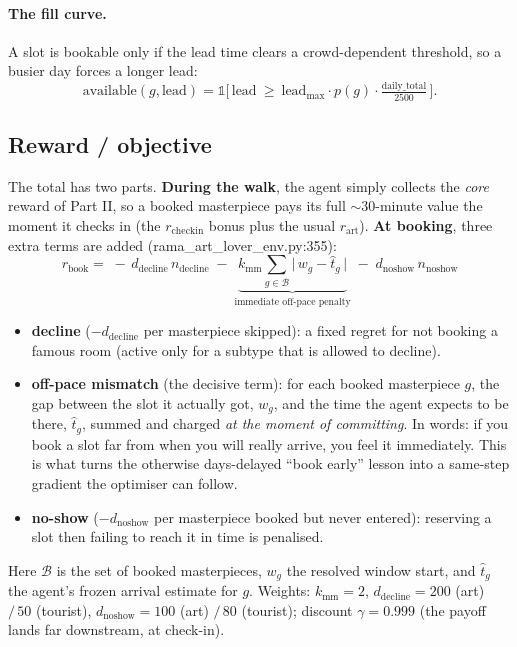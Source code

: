 \documentclass[11pt]{article}
\newcommand{\ind}{\mathbb{1}}
\begin{document}
\paragraph{The fill curve.} A slot is bookable only if the lead time clears a
crowd-dependent threshold, so a busier day forces a longer lead:
\[
\text{available}(g,\text{lead})=\ind\!\Big[\,\text{lead}\ \ge\ \text{lead}_{\max}\cdot p(g)\cdot \tfrac{\text{daily\_total}}{2500}\,\Big].
\]

\subsection{Reward / objective}

The total has two parts. \textbf{During the walk}, the agent simply collects the
\emph{core} reward of Part II, so a booked masterpiece pays its full $\sim$30-minute
value the moment it checks in (the $r_{\text{checkin}}$ bonus plus the usual
$r_{\text{art}}$). \textbf{At booking}, three extra terms are added
(rama\_art\_lover\_env.py:355):
\[
\boxed{\;r_{\text{book}}=\;-\,d_{\text{decline}}\,n_{\text{decline}}\;-\;\underbrace{k_{\text{mm}}\!\!\sum_{g\in\mathcal{B}}\big|\,w_g-\hat t_g\,\big|}_{\text{immediate off-pace penalty}}\;-\;d_{\text{noshow}}\,n_{\text{noshow}}\;}
\]
\begin{itemize}
\item \textbf{decline} ($-d_{\text{decline}}$ per masterpiece skipped): a fixed regret for not booking a famous room (active only for a subtype that is allowed to decline).
\item \textbf{off-pace mismatch} (the decisive term): for each booked masterpiece $g$, the gap between the slot it actually got, $w_g$, and the time the agent expects to be there, $\hat t_g$, summed and charged \emph{at the moment of committing}. In words: if you book a slot far from when you will really arrive, you feel it immediately. This is what turns the otherwise days-delayed ``book early'' lesson into a same-step gradient the optimiser can follow.
\item \textbf{no-show} ($-d_{\text{noshow}}$ per masterpiece booked but never entered): reserving a slot then failing to reach it in time is penalised.
\end{itemize}
Here $\mathcal{B}$ is the set of booked masterpieces, $w_g$ the resolved window start, and
$\hat t_g$ the agent's frozen arrival estimate for $g$. Weights: $k_{\text{mm}}=2$,
$d_{\text{decline}}=200$ (art) $/\,50$ (tourist), $d_{\text{noshow}}=100$ (art) $/\,80$
(tourist); discount $\gamma=0.999$ (the payoff lands far downstream, at check-in).
\end{document}
